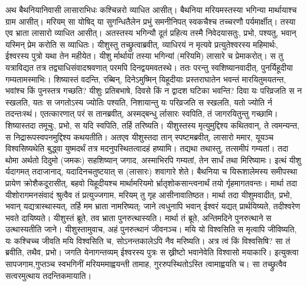 \adhyAya
{}
\vakya अथ बैथनियानिवासी लासाराभिधः कश्चिन्नरो व्याधित आसीत्। बैथनिया मरियमस्तस्या भगिन्या मार्थायाश्च ग्राम आसीत्।
\vakya मरियम् सा योषिद् या सुगन्धितैलेन प्रभुं समनीनिपत् स्वकचैश्च तच्चरणौ पर्यमार्क्षीत्। तस्या एव भ्राता लासारो व्याधित आसीत्।
\vakya अतस्तस्य भगिन्यौ दूतं प्रहित्य तस्मै निवेदयासतुः, प्रभो, पश्यतु, भवान् यस्मिन् प्रेम करोति स व्याधितः।
\vakya यीशुस्तु तच्छ्रुत्वाब्रवीत्, व्याधिरयं न मृत्यवे प्रत्युतेश्वरस्य महिमार्थः, ईश्वरस्य पुत्रो यथा तेन महीयेत।
\vakya यीशु र्मार्थायां तस्या भगिन्यां (मरियमि) लासारे च प्रेमाकरोत्।
\vakya स तु यत्राविद्यत तत्र तद्व्याधिसंवादश्रवणात् परमपि दिनद्वयमवतस्थे।
\vakya ततः परन्तु स्वशिष्यानवादीत्, पुनर्यिहूदीया गम्यतामस्माभिः।
\vakya शिष्यास्तं वदन्ति, रब्बिन्, दिनेऽमुष्मिन् यिहूदीयाः प्रस्तराघातेन भवन्तं मारयितुमयतन्त, भवांश्च किं पुनस्तत्र गच्छति?
\vakya यीशुः प्रतिबभाषे, दिवसे किं न द्वादश घटिका भवन्ति? दिवा यः परिव्रजति स न स्खलति, यतः स जगतोऽस्य ज्योतिः पश्यति,
\vakya निशायान्तु यः परिव्रजति स स्खलति, यतो ज्योति र्न तदन्तःस्थं।
\vakya एतत्कारणात् परं स तानब्रवीत्, अस्मद्बन्धु र्लासारः स्वपिति, तं जागरयितुन्तु गच्छामि।
\vakya शिष्यास्तदा तमूचुः, प्रभो, स यदि स्वपिति, तर्हि तरिष्यति।
\vakya यीशुस्तस्य मृत्युमुद्दिश्य कथितवान्, ते त्वमन्यन्त, स निद्रारूपस्वपनमुद्दिश्य कथयतीति।
\vakya अतएव यीशुस्तदा तान् स्पष्टमब्रवीत्, लासारो ममार, यूयञ्च विश्वसिष्यथेति बुद्ध्वा युष्मदर्थं तत्र मदनुपस्थितत्वादहं हष्यामि।
\vakya तद्यथा तथास्तु, तत्समीपं गम्यतां।
\vakya तदा थोमा अर्थतो दिदुमो (जमकः) सहशिष्यान् जगाद, अस्माभिरपि गम्यतां, तेन सार्धं तथा मिरिष्यामः।
\vakya इत्थं यीशु र्यदागमत् तदाजानाद्, यदादिनचतुष्टयात् स (लासारः) शवागारे शेते।
\vakya बैथनिया च यिरूशालेमस्य समीपस्था प्रायेण क्रोशैकदूरासीत्,
\vakya बहवो यिहूदीयश्च मार्थामरियमो र्भ्रातृशोकसान्त्वनार्थं तयो र्गृहमागतवन्तः।
\vakya मार्था तदा यीशोरागमनसंवादं श्रुत्वैव तं प्रत्युज्जगाम, मरियम् तु गृह आसीनावातिष्ठत।
\vakya मार्था तदा यीशुमवादीत्, प्रभो, भवान् यद्यत्रास्थास्यत्, तर्हि मम भ्राता नामरिष्यत्;
\vakya जाने त्वधुनापि भवान् ईश्वरं यद्यत् प्रार्थयिष्यते, तदीश्वरेण भवते दायिष्यते।
\vakya यीशुस्तं ब्रूते, तव भ्राता पुनरुत्थास्यति।
\vakya मार्था तं ब्रूते, अन्तिमदिने पुनरुत्थाने स उत्थास्यतीति जाने।
\vakya यीशुस्तामुवाच, अहं पुनरुत्थानं जीवनञ्च। मयि यो विश्वसिति स मृत्वापि जीविष्यति,
\vakya यः कश्चिच्च जीवति मयि विश्वसिति च, सोऽनन्तकालेऽपि नैव मरिष्यति। अत्र त्वं किं विश्वसिषि?
\vakya सा तं ब्रवीति, तथैव, प्रभो। जगति येनागन्तव्यम् ईश्वरस्य पुत्रः स ख्रीष्टो भवानेवेति विश्वासो मयाकारि।
\vakya इत्युक्त्वा सापजगाम,गुप्तञ्च स्वभगिनीं मरियममाह्वयन्ती तामाह, गुररुपस्थितोऽस्ति त्वामाह्वयति च।
\vakya सा तच्छ्रुत्वैव सत्वरमुत्थाय तदन्तिकमायाति।
